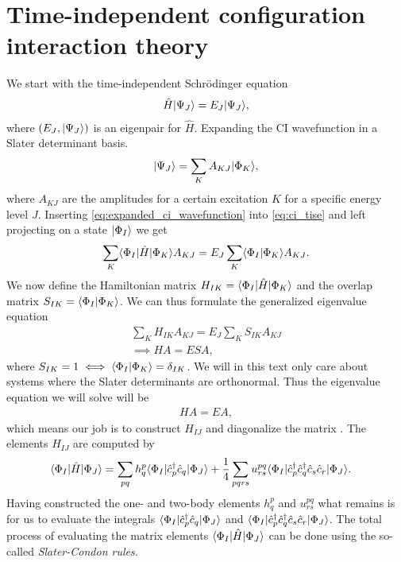      \section{Time-independent configuration interaction theory}
        We start with the time-independent Schrödinger equation
        \begin{align}
            \hat{H}| \Psi_J \rangle = E_J| \Psi_J \rangle,
            \label{eq:ci_tise}
        \end{align}
        where $(E_J, | \Psi_J \rangle)$ is an eigenpair for $\hat{H}$. Expanding the
        CI wavefunction in a Slater determinant basis.
        \begin{align}
            | \Psi_J \rangle = \sum_{K} A_{KJ}| \Phi_K \rangle,
            \label{eq:expanded_ci_wavefunction}
        \end{align}
        where $A_{KJ}$ are the amplitudes for a certain excitation $K$ for a
        specific energy level $J$. Inserting
        \autoref{eq:expanded_ci_wavefunction} into \autoref{eq:ci_tise} and left
        projecting on a state $| \Phi_I \rangle$ we get
        \begin{align}
            \sum_{K}\langle \Phi_I |\hat{H}| \Phi_K \rangle A_{KJ}
            = E_J\sum_{K}\langle \Phi_I | \Phi_K \rangle A_{KJ}.
        \end{align}
        We now define the Hamiltonian matrix $H_{IK} =
        \langle \Phi_I |\hat{H}| \Phi_K \rangle$ and the overlap matrix $S_{IK} =
        \langle \Phi_I | \Phi_K \rangle$. We can thus formulate the generalized
        eigenvalue equation
        \begin{gather}
            \sum_{K}H_{IK}A_{KJ} = E_J\sum_{K}S_{IK}A_{KJ}
            \\
            \implies
            HA = ESA,
        \end{gather}
        where $S_{IK} = 1 \iff \langle \Phi_I | \Phi_K \rangle = \delta_{IK}$. We will
        in this text only care about systems where the Slater determinants are
        orthonormal. Thus the eigenvalue equation we will solve will be
        \begin{align}
            HA = EA,
        \end{align}
        which means our job is to construct $H_{IJ}$ and diagonalize the
        matrix \cite{karwowski}. The elements $H_{IJ}$ are computed by
        \begin{align}
            \langle \Phi_I |\hat{H}| \Phi_J \rangle
            &= \sum_{pq}h^{p}_{q}
            \langle \Phi_I |\hat{c}_{p}^{\dagger}\hat{c}_{q}| \Phi_J \rangle
            + \frac{1}{4}\sum_{pqrs}u^{pq}_{rs}
            \langle \Phi_I |\hat{c}_{p}^{\dagger}\hat{c}_{q}^{\dagger}\hat{c}_{s}\hat{c}_{r}| \Phi_J \rangle.
        \end{align}
        Having constructed the one- and two-body elements $h^{p}_{q}$ and
        $u^{pq}_{rs}$ what remains is for us to evaluate the integrals
        $\langle \Phi_I |\hat{c}_{p}^{\dagger}\hat{c}_{q}| \Phi_J \rangle$ and
        $\langle \Phi_I |\hat{c}_{p}^{\dagger}\hat{c}_{q}^{\dagger}\hat{c}_{s}\hat{c}_{r}| \Phi_J \rangle$. The total
        process of evaluating the matrix elements
        $\langle \Phi_I |\hat{H}| \Phi_J \rangle$ can be done using the so-called
        \emph{Slater-Condon rules}.
